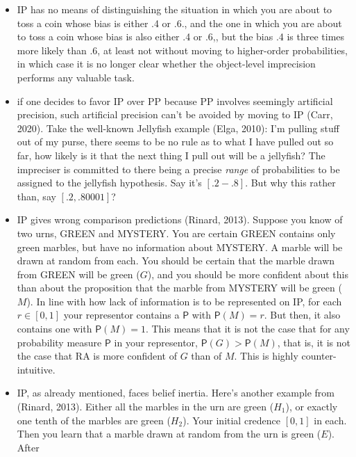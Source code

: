 \documentclass[
  10pt,
  dvipsnames,enabledeprecatedfontcommands]{scrartcl}
\newcommand{\pr}[1]{\mathsf{P}(#1)}
\begin{document}
\begin{itemize}
\item
  \textsf{IP} has no means of distinguishing the situation in which you
  are about to toss a coin whose bias is either .4 or .6., and the one
  in which you are about to toss a coin whose bias is also either .4 or
  .6,, but the bias .4 is three times more likely than .6, at least not
  without moving to higher-order probabilities, in which case it is no
  longer clear whether the object-level imprecision performs any
  valuable task.
\item
  if one decides to favor \textsf{IP} over \textsf{PP} because
  \textsf{PP} involves seemingly artificial precision, such artificial
  precision can't be avoided by moving to IP (Carr, 2020). Take the
  well-known Jellyfish example (Elga, 2010): I'm pulling stuff out of my
  purse, there seems to be no rule as to what I have pulled out so far,
  how likely is it that the next thing I pull out will be a jellyfish?
  The impreciser is committed to there being a precise \emph{range} of
  probabilities to be assigned to the jellyfish hypothesis. Say it's
  \([.2-.8]\). But why this rather than, say \([.2,.80001]\)?
\item
  \textsf{IP} gives wrong comparison predictions (Rinard, 2013). Suppose
  you know of two urns, \textsf{GREEN} and \textsf{MYSTERY}. You are
  certain \textsf{GREEN} contains only green marbles, but have no
  information about \textsf{MYSTERY}. A marble will be drawn at random
  from each. You should be certain that the marble drawn from
  \textsf{GREEN} will be green (\(G\)), and you should be more confident
  about this than about the proposition that the marble from
  \textsf{MYSTERY} will be green (\(M\)). In line with how lack of
  information is to be represented on \textsf{IP}, for each
  \(r\in [0,1]\) your representor contains a \(\mathsf{P}\) with
  \(\pr{M}=r\). But then, it also contains one with \(\pr{M}=1\). This
  means that it is not the case that for any probability measure
  \(\mathsf{P}\) in your representor, \(\mathsf{P}(G) > \mathsf{P}(M)\),
  that is, it is not the case that RA is more confident of \(G\) than of
  \(M\). This is highly counter-intuitive.
\item
  \textsf{IP}, as already mentioned, faces belief inertia. Here's
  another example from (Rinard, 2013). Either all the marbles in the urn
  are green (\(H_1\)), or exactly one tenth of the marbles are green
  (\(H_2\)). Your initial credence \([0,1]\) in each. Then you learn
  that a marble drawn at random from the urn is green (\(E\)). After

\end{itemize}
\end{document}
